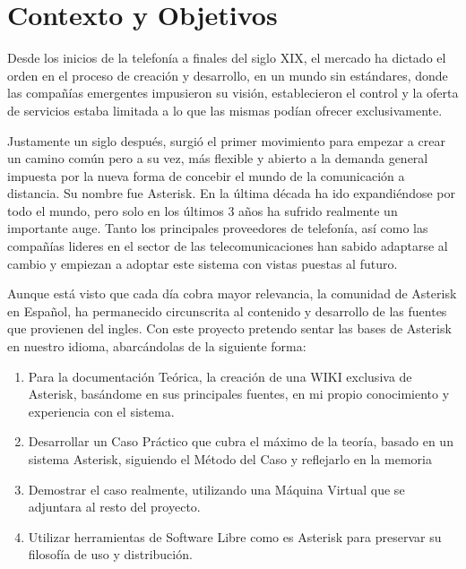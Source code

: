 
\setlength\parskip{10px}

\section{Contexto y Objetivos}

Desde los inicios de la telefonía a finales del siglo XIX, el mercado ha dictado el orden en el proceso de creación y desarrollo, en un mundo sin estándares, donde las compañías emergentes impusieron su visión, establecieron el control y la oferta de servicios estaba limitada a lo que las mismas podían ofrecer exclusivamente.

Justamente un siglo después, surgió el primer movimiento para empezar a crear un camino común pero a su vez, más flexible y abierto a la demanda general impuesta por la nueva forma de concebir el mundo de la comunicación a distancia. Su nombre fue Asterisk. En la última década ha ido expandiéndose por todo el mundo, pero solo en los últimos 3 años ha sufrido realmente un importante auge. Tanto los principales proveedores de telefonía, así como las compañías lideres en el sector de las telecomunicaciones han sabido adaptarse al cambio y empiezan a adoptar este sistema con vistas puestas al futuro.

Aunque está visto que cada día cobra mayor relevancia, la comunidad de Asterisk en Español, ha permanecido circunscrita al contenido y desarrollo de las fuentes que provienen del ingles. Con este proyecto pretendo sentar las bases de Asterisk en nuestro idioma, abarcándolas de la siguiente forma:

\begin{enumerate}
	\item Para la documentación Teórica, la creación de una WIKI exclusiva de Asterisk, basándome en sus principales fuentes, en mi propio conocimiento y experiencia con el sistema.
	\item Desarrollar un Caso Práctico que cubra el máximo de la teoría, basado en un sistema Asterisk, siguiendo el Método del Caso y reflejarlo en la memoria
  \item Demostrar el caso realmente, utilizando una Máquina Virtual que se adjuntara al resto del proyecto.
  \item Utilizar herramientas de Software Libre como es Asterisk para preservar su filosofía de uso y distribución.
\end{enumerate}

